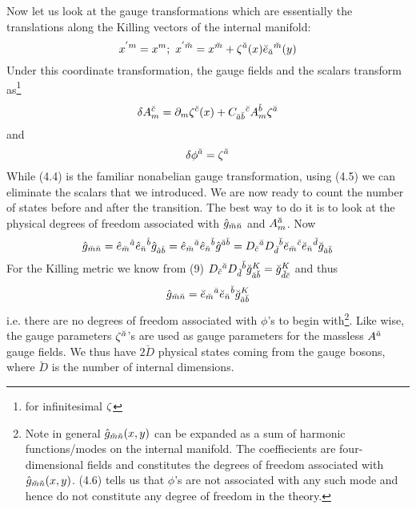 \documentclass[a4paper,12pt]{article}
\begin{document}
Now let us look at the gauge transformations which are essentially the translations along the Killing vectors of the internal manifold:
\begin{equation}
x^{'m}=x^m;\ x^{'\ms}=x^{\ms}+\ze^{\as}(x)\es_{\as}{}^{\ms}(y)
\end{equation}
Under this coordinate transformation, the gauge fields and the scalars transform as\footnote{for  infinitesimal $\zeta$}
\begin{equation}
\delta A_m^{\breve{c}}=\partial_m\zeta^{\breve{c}}(x)+C_{\breve{a}\breve{b}}{}^{\breve{c}}A_m^{\breve{b}}\zeta^{\breve{a}}
\end{equation}
and
\begin{equation}
\delta \phi^{\breve{a}}=\zeta^{\breve{a}}
\end{equation}
While (4.4) is the familiar nonabelian gauge transformation, using (4.5) we can eliminate the scalars that we introduced. We are now ready to count the number of states before and after the transition. The best way to do it is to look at the physical degrees of freedom associated with $\hat{g}_{\breve{m}\breve{n}}$ and $A_m^{\breve{a}}$. Now
$$
\hat{g}_{\breve{m}\breve{n}}=\hat{e}_{\breve{m}}{}^{\hat{a}}\hat{e}_{\breve{n}}{}^{\hat{b}}\hat{g}_{\hat{a}\hat{b}}=\hat{e}_{\breve{m}}{}^{\breve{a}}\hat{e}_{\breve{n}}{}^{\breve{b}}\hat{g}^{\breve{a}\breve{b}}=D_{\breve{c}}{}^{\breve{a}}D_{\breve{d}}{}^{\breve{b}}\breve{e}_{\breve{m}}{}^{\breve{c}}\breve{e}_{\breve{n}}{}^{\breve{d}}\breve{g}_{\breve{a}\breve{b}}$$
For the Killing metric we know from (9) $D_{\breve{c}}{}^{\breve{a}}D_{\breve{d}}{}^{\breve{b}}\breve{g}_{\breve{a}\breve{b}}^{K}=\breve{g}_{\breve{d}\breve{c}}^{K}$ and thus
\begin{equation}
\hat{g}_{\breve{m}\breve{n}}=\breve{e}_{\breve{m}}{}^{\breve{a}}\breve{e}_{\breve{n}}{}^{\breve{b}}\breve{g}^K_{\breve{a}\breve{b}}
\end{equation}
i.e. there are no  degrees of freedom associated with $\phi$'s to begin with\footnote{Note in general $\hat{g}_{\breve{m}\breve{n}}(x,y)$ can be expanded as a sum of harmonic functions/modes on the internal manifold. The coeffiecients are four-dimensional fields and constitutes the degrees of freedom associated with $\hat{g}_{\breve{m}\breve{n}}(x,y)$. (4.6) tells us that $\phi$'s are not associated with any such mode and hence do not constitute any degree of freedom in the theory.}. Like wise, the gauge parameters $\zeta^{\breve{a}}$'s are used as gauge parameters for the massless $A^{\breve{a}}$ gauge fields. We thus have $2\breve{D}$ physical states coming from the gauge bosons, where $\breve{D}$ is the number of internal dimensions. 
\end{document}
